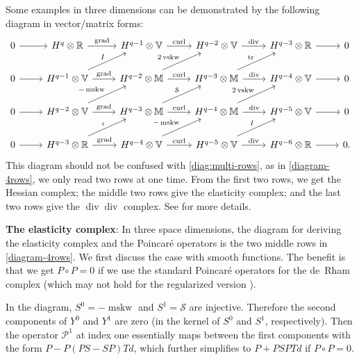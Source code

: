 \documentclass[11pt]{amsart}
\newcommand{\0}{\mathaccent23}
\newcommand\tr{\operatorname{tr}}
\newcommand\vskw{\operatorname{vskw}}
\newcommand\mskw{\operatorname{mskw}}
\newcommand\grad{\operatorname{grad}}
\renewcommand\div{\operatorname{div}}
\newcommand\curl{\operatorname{curl}}
\begin{document}
 Some examples in three dimensions can be demonstrated by the following diagram in vector/matrix forms:
 \begin{equation}\label{diagram-4rows}
\begin{tikzcd}
0 \arrow{r} &H^{q}\otimes \mathbb{R}  \arrow{r}{\grad} &H^{q-1}\otimes \mathbb{V} \arrow{r}{\curl} &H^{q-2}\otimes \mathbb{V} \arrow{r}{\div} & H^{q-3}\otimes \mathbb{R} \arrow{r}{} & 0\\
0 \arrow{r}&H^{q-1}\otimes \mathbb{V}\arrow{r}{\grad} \arrow[ur, "I"]&H^{q-2}\otimes \mathbb{M}  \arrow{r}{\curl} \arrow[ur, "2\vskw"]&H^{q-3}\otimes \mathbb{M} \arrow{r}{\div}\arrow[ur, "\tr"] & H^{q-4}\otimes \mathbb{V} \arrow{r}{} & 0\\
0 \arrow{r} &H^{q-2}\otimes \mathbb{V}\arrow{r}{\grad} \arrow[ur, "-\mskw"]&H^{q-3}\otimes \mathbb{M}  \arrow{r}{\curl} \arrow[ur, "\mathcal{S}"]&H^{q-4}\otimes \mathbb{M} \arrow{r}{\div}\arrow[ur, "2\vskw"] & H^{q-5}\otimes \mathbb{V} \arrow{r}{} & 0\\
0 \arrow{r} &H^{q-3}\otimes \mathbb{R}\arrow{r}{\grad} \arrow[ur, "\iota"]&H^{q-4}\otimes \mathbb{V}  \arrow{r}{\curl} \arrow[ur, "-\mskw"]&H^{q-5}\otimes \mathbb{V} \arrow{r}{\div}\arrow[ur, "I"] & H^{q-6}\otimes \mathbb{R} \arrow{r}{} & 0.
 \end{tikzcd}
\end{equation}
This diagram should not be confused with \eqref{diag:multi-rows}, as in \eqref{diagram-4rows}, we only read two rows at one time. From the first two rows, we get the Hessian complex; the middle two rows give the elasticity complex; and the last two rows give the $\div\div$ complex. See \cite{arnold2021complexes} for more details.  

\textbf{The elasticity complex}: In three space dimensions, the diagram for deriving the elasticity complex and the Poincar\'e operators is the two middle rows in \eqref{diagram-4rows}.
We first discuss the case with smooth functions. The benefit is that we get $P\circ P=0$ if we use the standard Poincar\'e operators for the de~Rham complex (which may not hold for the regularized version \cite{costabel2010bogovskiui}).

In the diagram, $S^{0}=-\mskw$ and $S^{1}=\mathcal{S}$ are injective. Therefore the second components of $Y^{0}$ and $Y^{1}$ are zero (in the kernel of $S^{0}$ and $S^{1}$, respectively). Then the operator $\mathscr{P}^{1}$ at index one essentially maps between the first components with the form $P-P(PS-SP)Td$, which further simplifies to $P+PSPTd$ if 
$P\circ P=0$.  
\end{document}
